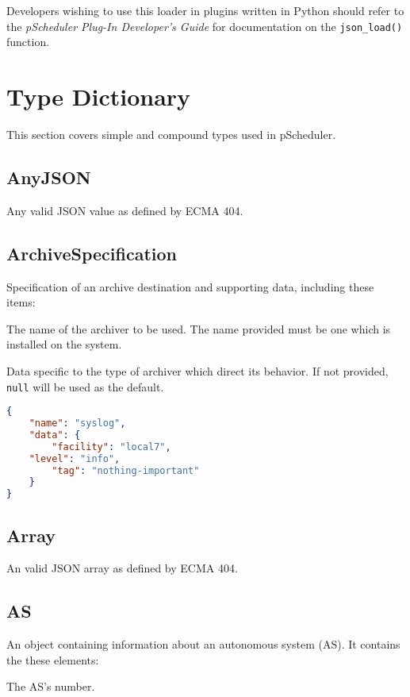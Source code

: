 \documentclass[10pt]{article}
\begin{document}
Developers wishing to use this loader in plugins written in Python
should refer to the {\it pScheduler Plug-In Developer's Guide} for
documentation on the {\tt json_load()} function.  


%
%

\section{Type Dictionary}

This section covers simple and compound types used in pScheduler.


\subsection{AnyJSON}
Any valid JSON value as defined by ECMA 404.



\subsection{ArchiveSpecification}
Specification of an archive destination and supporting data, including these items:

 The name of the archiver to be used.  The
name provided must be one which is installed on the system.

 Data specific to the type of archiver which
direct its behavior.  If not provided, {\tt null} will be used as the
default.

\example
\begin{lstlisting}[language=json]
{
    "name": "syslog",
    "data": {
        "facility": "local7",
	"level": "info",
        "tag": "nothing-important"
    }
}
\end{lstlisting}



\subsection{Array}
An valid JSON array as defined by ECMA 404.


\subsection{AS}
An object containing information about an autonomous system (AS).  It
contains the these elements:

 The AS's number.
\end{document}
